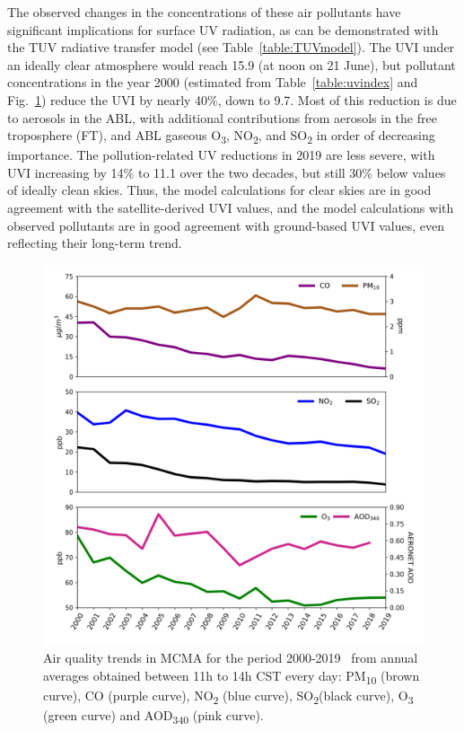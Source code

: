 \documentclass[10pt]{article}
\begin{document}
The observed changes in the concentrations of these air pollutants have
significant implications for surface UV radiation, as can be
demonstrated with the TUV radiative transfer model (see
Table~{\ref{table:TUVmodel}}). The UVI under an ideally
clear atmosphere would reach 15.9 (at noon on 21 June), but pollutant
concentrations in the year 2000 (estimated from
Table~{\ref{table:uvindex}} and
Fig.~{\ref{829996}}) reduce the UVI by nearly 40\%,
down to 9.7. Most of this reduction is due to aerosols in the ABL, with
additional contributions from aerosols in the free troposphere (FT), and
ABL gaseous O\textsubscript{3}, NO\textsubscript{2}, and
SO\textsubscript{2} in order of decreasing importance. The
pollution-related UV reductions in 2019 are less severe, with UVI
increasing by 14\% to 11.1 over the two decades, but still 30\% below
values of ideally clean skies. Thus, the model calculations for clear
skies are in good agreement with the satellite-derived UVI values, and
the model calculations with observed pollutants are in good agreement
with ground-based UVI values, even reflecting their long-term trend.
\begin{figure}[H]
\begin{center}
\includegraphics[width=0.63\columnwidth]{figures/contCDMX/contCDMX}
\caption{{Air quality trends in MCMA for the period 2000-2019~ from annual
averages obtained between 11h to 14h CST every day: PM\textsubscript{10}
(brown curve), CO (purple curve), NO\textsubscript{2} (blue curve),
SO\textsubscript{2}(black curve), O\textsubscript{3} (green curve) and
AOD\textsubscript{340} (pink curve).
{\label{829996}}%
}}
\end{center}
\end{figure}
\end{document}
